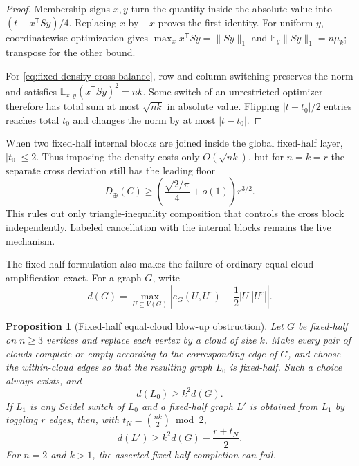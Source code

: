 \documentclass[11pt]{article}
\newtheorem{proposition}[theorem]{Proposition}
\newcommand{\E}{\mathbb E}
\begin{document}
\begin{proof}
Membership signs $x,y$ turn the quantity inside the absolute value into
$(t-x^{\mathsf T}Sy)/4$.  Replacing $x$ by $-x$ proves the first identity.
For uniform $y$, coordinatewise optimization gives
$\max_xx^{\mathsf T}Sy=\|Sy\|_1$ and
$\E_y\|Sy\|_1=n\mu_k$; transpose for the other bound.

For \eqref{eq:fixed-density-cross-balance}, row and column switching preserves
the norm and satisfies $\E_{x,y}(x^{\mathsf T}Sy)^2=nk$.  Some switch of an
unrestricted optimizer therefore has total sum at most $\sqrt{nk}$ in
absolute value.  Flipping $|t-t_0|/2$ entries reaches total $t_0$ and changes
the norm by at most $|t-t_0|$.
\end{proof}

When two fixed-half internal blocks are joined inside the global fixed-half
layer, $|t_0|\le2$.  Thus imposing the density costs
only $O(\sqrt{nk})$, but for $n=k=r$ the separate cross deviation still has
the leading floor
\[
 D_\oplus(C)\ge
 \left(\frac{\sqrt{2/\pi}}4+o(1)\right)r^{3/2}.
\]
This rules out only triangle-inequality composition that controls the cross
block independently.  Labeled cancellation with the internal blocks remains
the live mechanism.

The fixed-half formulation also makes the failure of ordinary equal-cloud
amplification exact.  For a graph $G$, write
\[
 d(G)=\max_{U\subseteq V(G)}
 \left|e_G(U,U^{\mathsf c})-\frac12|U||U^{\mathsf c}|\right|.
\]

\begin{proposition}[Fixed-half equal-cloud blow-up obstruction]
\label{prop:fixed-half-cloud-blowup}
Let $G$ be fixed-half on $n\ge3$ vertices and replace each vertex by a cloud
of size $k$.  Make every pair of clouds complete or empty according to the
corresponding edge of $G$, and choose the within-cloud edges so that the
resulting graph $L_0$ is fixed-half.  Such a choice always exists, and
\[
 d(L_0)\ge k^2d(G).
\]
If $L_1$ is any Seidel switch of $L_0$ and a fixed-half graph $L'$ is obtained
from $L_1$ by toggling $r$ edges, then, with
$t_N=\binom{nk}{2}\bmod2$,
\begin{equation}
 d(L')\ge k^2d(G)-\frac{r+t_N}{2}.
 \label{eq:fixed-half-cloud-blowup}
\end{equation}
For $n=2$ and $k>1$, the asserted fixed-half completion can fail.
\end{proposition}
\end{document}
